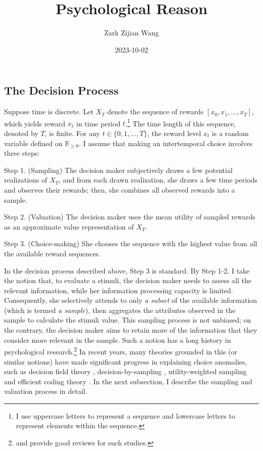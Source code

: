 \documentclass[
  12pt,
]{article}
\title{Psychological Reason}
\author{Zark Zijian Wang}
\date{2023-10-02}
\begin{document}
\maketitle

\hypertarget{the-decision-process}{%
\subsection{The Decision Process}\label{the-decision-process}}

Suppose time is discrete. Let \(X_T\) denote the sequence of rewards
\([x_0,x_1,...,x_T]\), which yields reward \(x_t\) in time period
\(t\).\footnote{I use uppercase letters to represent a sequence and
  lowercase letters to represent elements within the sequence.} The time
length of this sequence, denoted by \(T\), is finite. For any
\(t \in \{0,1,...,T\}\), the reward level \(x_t\) is a random variable
defined on \(\mathbb{R}_{\geq 0}\). I assume that making an
intertemporal choice involves three steps:

\setlength{\leftskip}{1cm}

Step 1. (Sampling) The decision maker subjectively draws a few potential
realizations of \(X_T\), and from each drawn realization, she draws a
few time periods and observes their rewards; then, she combines all
observed rewards into a sample.

Step 2. (Valuation) The decision maker uses the mean utility of sampled
rewards as an approximate value representation of \(X_T\).

Step 3. (Choice-making) She chooses the sequence with the highest value
from all the available reward sequences.

\setlength{\leftskip}{0pt}

In the decision process described above, Step 3 is standard. By Step
1-2, I take the notion that, to evaluate a stimuli, the decision maker
needs to assess all the relevant information, while her information
processing capacity is limited. Consequently, she selectively attends to
only \emph{a subset} of the available information (which is termed
\emph{a sample}), then aggregates the attributes observed in the sample
to calculate the stimuli value. This sampling process is not unbiased;
on the contrary, the decision maker aims to retain more of the
information that they consider more relevant in the sample. Such a
notion has a long history in psychological research.\footnote{\citet{weber_mindful_2009}
  and \citet{chun_taxonomy_2011} provide good reviews for such studies.}
In recent years, many theories grounded in this (or similar notions)
have made significant progress in explaining choice anomalies, such as
decision field theory \citep{busemeyer_decision_1993},
decision-by-sampling \citep{stewart_decision_2006}, utility-weighted
sampling \citep{lieder_overrepresentation_2018} and efficient coding
theory \citep{heng_efficient_2020}. In the next subsection, I describe
the sampling and valuation process in detail.

  
\end{document}
